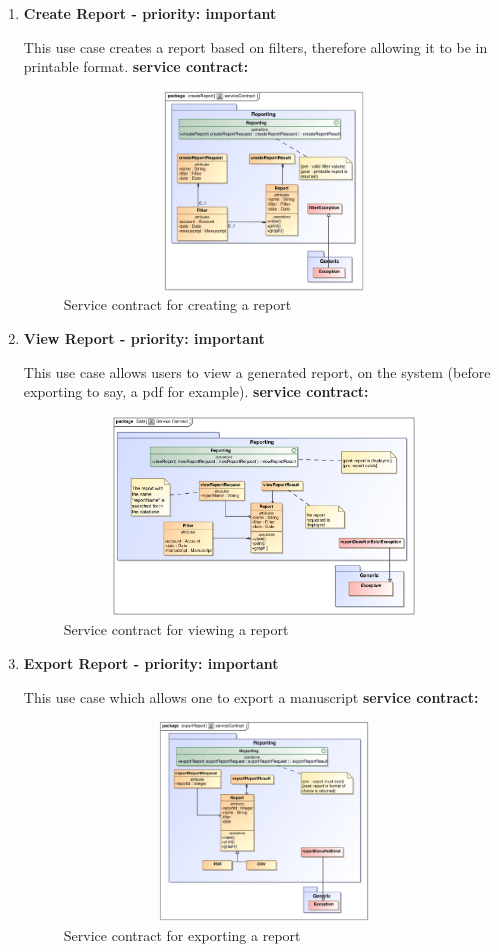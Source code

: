 \begin{enumerate}
\item\textbf{Create Report - priority: important}
\par{This use case creates a report based on filters, therefore allowing it to be in printable format.}
\textbf{service contract:}

\begin{figure}[h]
\includegraphics[height=200px, width=500px]{epsImages/Reporting/createReport.eps}
\caption{Service contract for creating a report}
\end{figure}
\newpage
\item \textbf{View Report - priority: important}
\par{This use case allows users to view a generated report, on the system (before exporting to say, a pdf for example).}
\textbf{service contract:}

\begin{figure}[h]
\includegraphics[height=200px, width=500px]{epsImages/Reporting/viewReportServiceContract.eps}

\caption{Service contract for viewing a report}
\end{figure}

\item \textbf{Export Report - priority: important}
\par{This use case which allows one to export a manuscript}
\textbf{service contract:}

\begin{figure}[h]
\includegraphics[height=200px, width=500px]{epsImages/Reporting/exportReport.eps}
\caption{Service contract for exporting a report}
\end{figure}


\end{enumerate}

